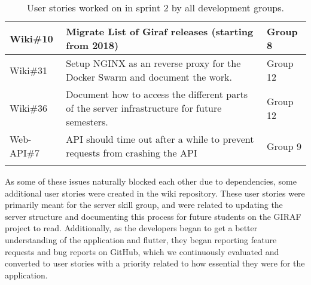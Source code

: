 \begin{longtable}{|p{2.8cm}|p{7cm}|p{2cm}|}
    Wiki\#10        & Migrate List of Giraf releases (starting from 2018)                                                                                                                                      & Group 8             \\ \hline
    Wiki\#31        & Setup NGINX as an reverse proxy for the Docker Swarm and document the work.                                                                                                              & Group 12            \\ \hline
    Wiki\#36        & Document how to access the different parts of the server infrastructure for future semesters.                                                                                            & Group 12            \\ \hline
    Web-API\#7      & API should time out after a while to prevent requests from crashing the API                                                                                                              & Group 9             \\ \hline
    \caption{User stories worked on in sprint 2 by all development groups.}\label{table:user-stories-sprint-2}
\end{longtable}

\noindent 
As some of these issues naturally blocked each other due to dependencies, some additional user stories were created in the wiki repository. 
These user stories were primarily meant for the server skill group, and were related to updating the server structure and documenting this process for future students on the GIRAF project to read.
Additionally, as the developers began to get a better understanding of the application and flutter, they began reporting feature requests and bug reports on GitHub, which we continuously evaluated and converted to user stories with a priority related to how essential they were for the application.

